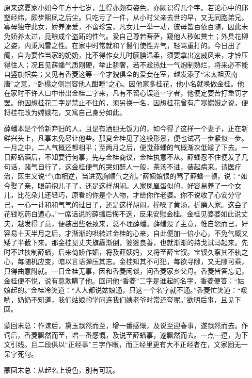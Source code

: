 \begin{parag}
    原来这夏家小姐今年方十七岁，生得亦颇有姿色，亦颇识得几个字。若论心中的邱壑经纬，颇步熙凤之后尘。只吃亏了一件，从小时父亲去世的早，又无同胞弟兄，寡母独守此女，娇养溺爱，不啻珍宝，凡女儿一举一动，彼母皆百依百随，因此未免娇养太过，竟酿成个盗跖的性气。爱自己尊若菩萨，窥他人秽如粪土；外具花柳之姿，内秉风雷之性。在家中时常就和丫鬟们使性弄气，轻骂重打的。今日出了阁，自为要作当家的奶奶，比不得作女儿时腼腆温柔，须要拿出这威风来，才钤压得住人；况且见薛蟠气质刚硬，举止骄奢，若不趁热灶一气炮制熟烂，将来必不能自竖旗帜矣；又见有香菱这等一个才貌俱全的爱妾在室，越发添了“宋太祖灭南唐”之意，“卧榻之侧岂容他人酣睡”之心。因他家多桂花，他小名就唤做金桂。他在家时不许人口中带出金桂二字来，凡有不留心误道一字者，他便定要苦打重罚才罢。他因想桂花二字是禁止不住的，须另换一名，因想桂花曾有广寒嫦娥之说，便将桂花改为嫦娥花，又寓自己身分如此。
\end{parag}


\begin{parag}
    薛蟠本是个怜新弃旧的人，且是有酒胆无饭力的，如今得了这样一个妻子，正在新鲜兴头上，凡事未免尽让他些。那夏金桂见了这般形景，便也试著一步紧似一步。一月之中，二人气概还都相平；至两月之后，便觉薛蟠的气概渐次低矮了下去。一日薛蟠酒后，不知要行何事，先与金桂商议，金桂执意不从。薛蟠忍不住便发了几句话，赌气自行了，这金桂便气的哭如醉人一般，茶汤不进，装起病来。请医疗治，医生又说“气血相逆，当进宽胸顺气之剂。”薛姨娘恨的骂了薛蟠一顿，说：“如今娶了亲，眼前抱儿子了，还是这样胡闹。人家凤凰蛋似的，好容易养了一个女儿，比花朵儿还轻巧，原看的你是个人物，才给你作老婆。你不说收了心安分守己，一心一计和和气气的过日子，还是这样胡闹，撞嗓了黄汤，折磨人家。这会子花钱吃药白遭心。”一席话说的薛蟠后悔不迭，反来安慰金桂。金桂见婆婆如此说丈夫，越发得了意，便装出些张致来，总不理薛蟠。薛蟠没了主意，惟自怨而已，好容易十天半月之后，才渐渐的哄转过金桂的心来，自此便加一倍小心，不免气概又矮了半截下来。那金桂见丈夫旗纛渐倒，婆婆良善，也就渐渐的持戈试马起来。先时不过挟制薛蟠，后来倚娇作媚，将及薛姨妈，又将至薛宝钗。宝钗久察其不轨之心，每随机应变，暗以言语弹压其志。金桂知其不可犯，每欲寻隙，又无隙可乘，只得曲意附就。一日金桂无事，因和香菱闲谈，问香菱家乡父母。香菱皆答忘记，金桂便不悦，说有意欺瞒了他。回问他“香菱”二字是谁起的名字，香菱便答：“姑娘起的。”金桂冷笑道：“人人都说姑娘通，只这一个名字就不通。”香菱忙笑道：“嗳哟，奶奶不知道，我们姑娘的学问连我们姨老爷时常还夸呢。”欲明后事，且见下回。
\end{parag}


\begin{parag}
    \begin{note}蒙回末总：作诔后，黛玉飘然而至，增一番感慨，及说至迎春事，遂飘然而去。作词后，香菱飘然而至，增一番感慨，及说至薛蟠事，遂飘然而去。一点一逗，为下文引线。且二段俱以“正经事”三字作眼，而正经里更有大不正经者在，文家固无一呆字死句。\end{note}
\end{parag}


\begin{parag}
    \begin{note}蒙回末总：从起名上设色，别有可玩。\end{note}
\end{parag}

